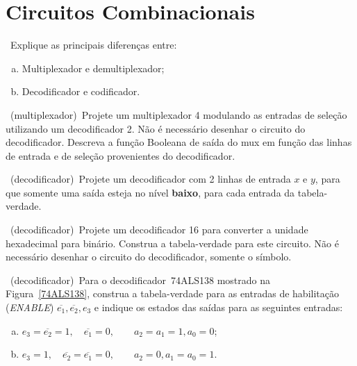 
\section*{Circuitos Combinacionais}

\exercise~Explique as principais diferenças entre:

\begin{enumerate}[a)]
\item Multiplexador e demultiplexador;
\item Decodificador e codificador.
\end{enumerate}

\exercise~(multiplexador)~Projete um multiplexador 4 modulando as
entradas de seleção utilizando um decodificador 2. Não é
necessário desenhar o circuito do decodificador. Descreva a função
Booleana de saída do mux em função das linhas de entrada e de seleção
provenientes do decodificador.

\exercise~(decodificador)~Projete um decodificador com 2 linhas de
entrada $x$ e $y$, para que somente uma saída esteja no nível {\bf
baixo}, para cada entrada da tabela-verdade.

\exercise~(decodificador)~Projete um decodificador 16 para
converter a unidade hexadecimal para binário. Construa a
tabela-verdade para este circuito. Não é necessário desenhar o
circuito do decodificador, somente o símbolo.

\pagebreak\exercise~(decodificador)~Para o decodificador~74ALS138 mostrado na
Figura~\ref{74ALS138}, construa a tabela-verdade para as entradas 
de habilitação ({\em ENABLE}) $\overline{e_1}, \overline{e_2}, e_3$ e indique os estados das 
saídas para as seguintes entradas:

\begin{enumerate}[a)]
\item $e_3=\overline{e_2}=1,\quad \overline{e_1}=0,\qquad a_2=a_1=1, a_0=0$;
\item $e_3=1,\quad \overline{e_2}=\overline{e_1}=0,\qquad a_2=0, a_1=a_0=1$.
\end{enumerate}

